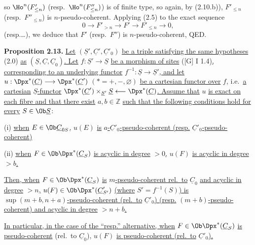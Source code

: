 %
so \(\Ho^n(F'_{\leq n})\) (resp.\ \(\Ho^n(F''_{\leq n})\)) is of finite type, so again, by (2.10.b)), \(F'_{\leq n}\) (resp.\ \(F''_{\leq n}\)) is \(n\)-pseudo-coherent. Applying (2.5) to the exact sequence
\[
  0\longrightarrow F'_{>n}\longrightarrow F'\longrightarrow F'_{\leq n}\longrightarrow 0,
\]
(resp.\dots), we deduce that \(F'\) (resp.\ \(F''\)) is \(n\)-pseudo-coherent, QED.

\textbf{Proposition 2.13.} \uline{Let} \((\underline{S}',\underline{C}',\underline{C}'_0)\) \uline{be a triple satisfying the same hypotheses} (2.0) \uline{as} \((\underline{S},\underline{C},\underline{C}_0)\)\uline{. Let} \(f:\underline{S}'\to \underline{S}\) \uline{be a morphism of sites} ([G] I 1.4)\uline{, corresponding to an underlying functor} \(f^{-1}:\underline{S}\to \underline{S}'\)\uline{, and let}
\(u:\Dpx^*(\underline{C})\longrightarrow \Dpx^*(\underline{C}')\) \((*=+,-,\varnothing)\)
\uline{be a cartesian functor over} \(f\)\uline{,} i.e.\ \uline{a cartesian} \(\underline{S}\)\uline{-functor} \(\Dpx^*(\underline{C}')\times_{\underline{S}'}\underline{S}\longleftarrow\Dpx^*(\underline{C})\)\uline{. Assume that} \(u\) \uline{is exact on each fibre and that there exist} \(a,b\in\mathbb Z\) \uline{such that the following conditions hold for every} \(S\in\Ob \underline{S}\):

(i) \uline{when} \(E\in\Ob\underline{C}_{0S}\)\uline{,} \(u(E)\) \uline{is} \(a\)\uline{-}\(\underline{C}'_0\)\uline{-pseudo-coherent (resp.} \(\underline{C}'_0\)\uline{-pseudo-coherent)}

(ii) \uline{when} \(F\in\Ob\Dpx^*(\underline{C}_S)\) \uline{is acyclic in degree} \(>0\)\uline{,} \(u(F)\) \uline{is acyclic in degree} \(>b\)\uline{.}

\uline{Then, when} \(F\in\Ob\Dpx^*(\underline{C}_S)\) \uline{is} \(m\)\uline{-pseudo-coherent rel.\ to} \(\underline{C}_0\) \uline{and acyclic in degree} \(>n\)\uline{,} \(u(F)\in\Ob\Dpx^*(\underline{C}'_{S'})\) \uline{(where} \(S'=f^{-1}(S)\)\uline{) is} \(\sup(m+b,n+a)\)\uline{-pseudo-coherent (rel.\ to} \(\underline{C}'_0\)\uline{) (resp.} \((m+b)\)\uline{-pseudo-coherent) and acyclic in degree} \(>n+b\)\uline{.}

\uline{In particular, in the case of the ``resp.'' alternative, when} \(F\in\Ob\Dpx^*(\underline{C}_S)\) \uline{is pseudo-coherent} (rel.\ to \(\underline{C}_0\)), \(u(F)\) \uline{is pseudo-coherent (rel.\ to} \(\underline{C}'_0\)\uline{).}


